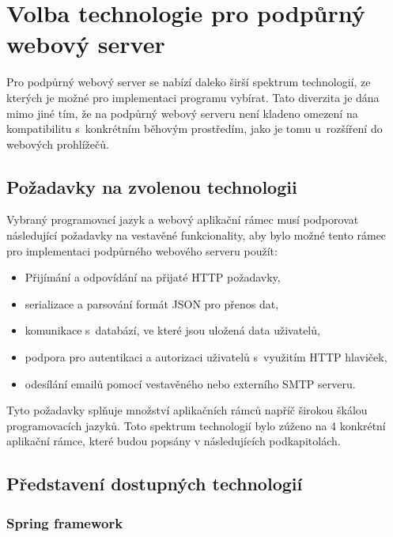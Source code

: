 \section{Volba technologie pro podpůrný webový server}

Pro podpůrný webový server se nabízí daleko širší spektrum technologií, ze kterých je možné pro implementaci programu vybírat. Tato diverzita je dána mimo jiné tím, že na podpůrný webový serveru není kladeno omezení na kompatibilitu s~konkrétním běhovým prostředím, jako je tomu u~rozšíření do webových prohlížečů. 

\subsection{Požadavky na zvolenou technologii}\label{sec:pozadavky-na-zvolenou-technologii}

Vybraný programovací jazyk a webový aplikační rámec musí podporovat následující požadavky na vestavěné funkcionality, aby bylo možné tento rámec pro implementaci podpůrného webového serveru použít:

\begin{itemize}
    \item Přijímání a odpovídání na přijaté HTTP požadavky,
    \item serializace a parsování formát JSON pro přenos dat,
    \item komunikace s~databází, ve které jsou uložená data uživatelů,
    \item podpora pro autentikaci a autorizaci uživatelů s~využitím HTTP hlaviček,
    \item odesílání emailů pomocí vestavěného nebo externího SMTP serveru.
\end{itemize}

Tyto požadavky splňuje množství aplikačních rámců napříč širokou škálou programovacích jazyků. Toto spektrum technologií bylo zúženo na 4 konkrétní aplikační rámce, které budou popsány v následujících podkapitolách.

\subsection{Představení dostupných technologií}

\subsubsection{Spring framework}\label{sec:spring-boot}

